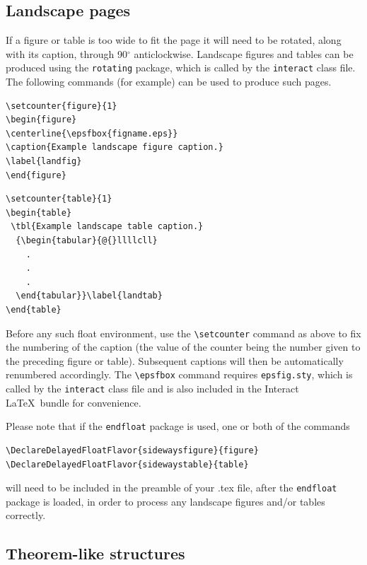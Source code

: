 \documentclass[]{interact}
\theoremstyle{plain}%
\theoremstyle{definition}
\theoremstyle{remark}
\begin{document}
\subsection{Landscape pages}

If a figure or table is too wide to fit the page it will need to be rotated, along with its caption, through 90$^{\circ}$ anticlockwise. Landscape figures and tables can be produced using the \verb"rotating" package, which is called by the \texttt{interact} class file. The following commands (for example) can be used to produce such pages.
\begin{verbatim}
\setcounter{figure}{1}
\begin{figure}
\centerline{\epsfbox{figname.eps}}
\caption{Example landscape figure caption.}
\label{landfig}
\end{figure}
\end{verbatim}
\begin{verbatim}
\setcounter{table}{1}
\begin{table}
 \tbl{Example landscape table caption.}
  {\begin{tabular}{@{}llllcll}
    .
    .
    .
  \end{tabular}}\label{landtab}
\end{table}
\end{verbatim}
Before any such float environment, use the \verb"\setcounter" command as above to fix the numbering of the caption (the value of the counter being the number given to the preceding figure or table). Subsequent captions will then be automatically renumbered accordingly. The \verb"\epsfbox" command requires \verb"epsfig.sty", which is called by the \texttt{interact} class file and is also included in the \textsf{Interact} \LaTeX\ bundle for convenience.

Please note that if the \verb"endfloat" package is used, one or both of the commands
\begin{verbatim}
\DeclareDelayedFloatFlavor{sidewaysfigure}{figure}
\DeclareDelayedFloatFlavor{sidewaystable}{table}
\end{verbatim}
will need to be included in the preamble of your .tex file, after the \verb"endfloat" package is loaded, in order to process any landscape figures and/or tables correctly.


\subsection{Theorem-like structures}
\end{document}

